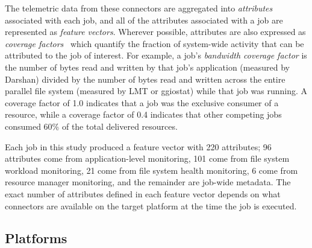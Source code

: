 The telemetric data from these connectors are aggregated into \emph{attributes} associated with each job, and all of the attributes associated with a job are represented as \emph{feature vectors}.
Wherever possible, attributes are also expressed as \emph{coverage factors}~\cite{Lockwood2017} which quantify the fraction of system-wide activity that can be attributed to the job of interest.
For example, a job's \emph{bandwidth coverage factor} is the number of bytes read and written by that job's application (measured by Darshan) divided by the number of bytes read and written across the entire parallel file system (measured by LMT or ggiostat) while that job was running.
A coverage factor of 1.0 indicates that a job was the exclusive consumer of
a resource, while a coverage factor of 0.4 indicates that other competing
jobs consumed 60\% of the total delivered resources.

Each job in this study produced a feature vector with 220 attributes; 96 attributes come from application-level monitoring, 101 come from file system workload monitoring, 21 come from file system health monitoring, 6 come from resource manager monitoring, and the remainder are job-wide metadata.
The exact number of attributes defined in each
feature vector depends on what connectors are available on the target platform at the time the job is executed.

\subsection{Platforms}\label{sec:methods/platforms}

